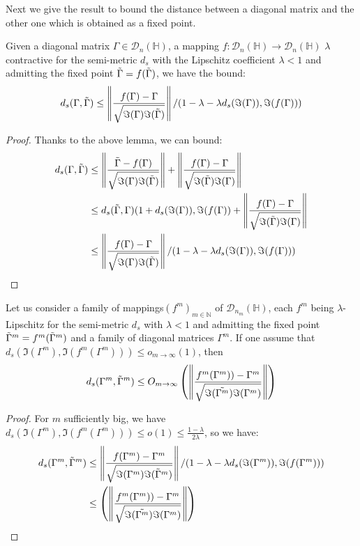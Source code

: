 \documentclass[ECP, preprint]{ejpecp} %
\begin{document}
Next we give the result to bound the distance between a diagonal matrix and the other one which is obtained as a fixed point.
\begin{proposition}
    Given a diagonal matrix $\Gamma\in \mathcal{D}_n(\mathbb{H})$, a mapping $f:\mathcal{D}_n(\mathbb{H})\to \mathcal{D}_n(\mathbb{H})$ $\lambda$ contractive for the semi-metric $d_s$ with the Lipschitz coefficient $\lambda<1$ and admitting the fixed point $\Tilde{\Gamma}=f(\Tilde{\Gamma})$, we have the bound:
    \begin{equation*}
        d_s(\Gamma,\Tilde{\Gamma})\leq \left\Vert \frac{f(\Gamma)-\Gamma}{\sqrt{\Im(\Gamma)\Im(\Tilde{\Gamma})}}\right\Vert/(1-\lambda-\lambda d_s(\Im(\Gamma)),\Im(f(\Gamma))) 
    \end{equation*}
\end{proposition}
\begin{proof}
    Thanks to the above lemma, we can bound:
    \begin{equation*}
    \begin{split}
        d_s(\Gamma,\Tilde{\Gamma})&\leq \left\Vert \frac{\tilde{\Gamma}-f(\Gamma)}{\sqrt{\Im(\Gamma)\Im(\Tilde{\Gamma})}}\right\Vert+\left\Vert \frac{f(\Gamma)-\Gamma}{\sqrt{\Im(\tilde{\Gamma})\Im(\Gamma)}} \right\Vert\\
        &\leq d_s(\tilde{\Gamma},\Gamma)(1+d_s(\Im(\Gamma)),\Im(f(\Gamma))+\left\Vert \frac{f(\Gamma)-\Gamma}{\sqrt{\Im(\tilde{\Gamma})\Im(\Gamma)}} \right\Vert\\
        &\leq \left\Vert \frac{f(\Gamma)-\Gamma}{\sqrt{\Im(\Gamma)\Im(\Tilde{\Gamma})}}\right\Vert/(1-\lambda-\lambda d_s(\Im(\Gamma)),\Im(f(\Gamma))) 
    \end{split}
    \end{equation*}
\end{proof}
\begin{proposition}
    Let us consider a family of mappings$(f^m)_{m\in\mathbb{N}}$ of $\mathcal{D}_{n_m}(\mathbb{H})$, each $f^m$ being $\lambda$-Lipschitz for the semi-metric $d_s$ with $\lambda<1$ and admitting the fixed point $\Tilde{\Gamma}^m=f^m(\Tilde{\Gamma}^m)$ and a family of diagonal matrices $\Gamma^m$. If one assume that $d_s(\Im(\Gamma^m),\Im(f^m(\Gamma^m)))\leq o_{m\to \infty}(1)$, then 
    $$d_s(\Gamma^m,\Tilde{\Gamma}^m)\leq O_{m\to\infty}\left(\left\Vert\frac{f^m(\Gamma^m))-\Gamma^m}{\sqrt{\Im(\Tilde{\Gamma^m})\Im(\Gamma^m)}}\right\Vert\right)$$
\end{proposition}
\begin{proof}
    For $m$ sufficiently big, we have $d_s(\Im(\Gamma^m),\Im(f^m(\Gamma^m)))\leq o(1)\leq \frac{1-\lambda}{2\lambda}$, so we have:
    \begin{equation*}
    \begin{split}
d_s(\Gamma^m,\Tilde{\Gamma}^m)& \leq \left\Vert \frac{f(\Gamma^m)-\Gamma^m}{\sqrt{\Im(\Gamma^m)\Im(\Tilde{\Gamma}^m)}}\right\Vert/(1-\lambda-\lambda d_s(\Im(\Gamma^m)),\Im(f(\Gamma^m))) \\
&\leq \left(\left\Vert\frac{f^m(\Gamma^m))-\Gamma^m}{\sqrt{\Im(\Tilde{\Gamma^m})\Im(\Gamma^m)}}\right\Vert\right)
    \end{split}
    \end{equation*}
\end{proof}
\end{document}

